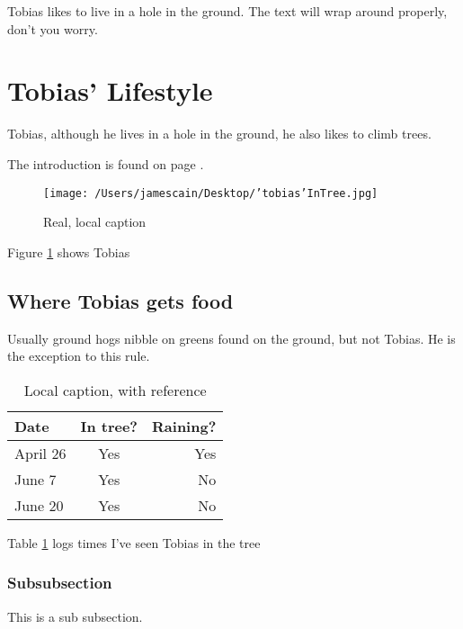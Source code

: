 \documentclass{article}
\begin{document}
Tobias likes to live in a hole in the ground. The text will wrap around properly, don't you worry.

\lipsum[1]


\newpage
\section{Tobias' Lifestyle}
Tobias, although he lives in a hole in the ground, he also likes to climb trees.

The introduction is found on page \pageref{sec:intro}.

\begin{figure}[H]
    \centering
    \texttt{[image: /Users/jamescain/Desktop/'tobias'InTree.jpg]}
    \caption[Optional caption]{Real, local caption}
    \label{fig:tobias}
\end{figure}

Figure \ref{fig:tobias} shows Tobias

\subsection{Where Tobias gets food}
Usually ground hogs nibble on greens found on the ground, but not Tobias. He is the exception to this rule.

\begin{table}[H]
    \centering
    \caption[This is optional caption, without reference]{Local caption, with reference}
    \label{tab:tobiastreesightings}
    \begin{tabular}{ l c r}
        \bfseries{Date} & In tree? & Raining? \\ \hline
        April 26 & Yes & Yes \\
        June 7 & Yes & No \\
        June 20 & Yes & No \\
    \end{tabular}
\end{table}

Table \ref{tab:tobiastreesightings} logs times I've seen Tobias in the tree

\subsubsection{Subsubsection}
This is a sub subsection.
\end{document}
